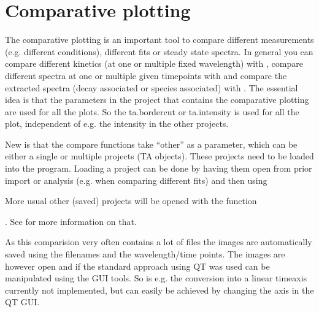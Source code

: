 \documentclass[letterpaper,10pt,english]{sphinxmanual}
\begin{document}
\chapter{Comparative plotting}
\label{\detokenize{Comparing:comparative-plotting}}\label{\detokenize{Comparing::doc}}
The comparative plotting is an important tool to compare different
measurements (e.g. different conditions), different fits or steady state
spectra. In general you can compare different kinetics
(at one or multiple fixed wavelength) with {\hyperref[\detokenize{Comparing:compare-at-wave}]{}} ,
compare different spectra at one or multiple given timepoints with
{\hyperref[\detokenize{Comparing:compare-at-time}]{}} and compare the extracted spectra (decay associated
or species associated) with {\hyperref[\detokenize{Comparing:compare-dac}]{}}. The essential idea is that the
parameters in the project that contains the comparative plotting are used
for all the plots. So the ta.bordercut or ta.intensity is used for all
the plot, independent of e.g. the intensity in the other projects.

New is that the compare functions take “other” as a parameter, which can
be either a single or multiple projects (TA \sphinxhyphen{} objects). These projects
need to be loaded into the program. Loading a project can be done by
having them open from prior import or analysis (e.g. when comparing different fits)
and then using

{\hyperref[\detokenize{plot_func:plot_func.TA.Copy}]{}}

More usual other (saved) projects will be
opened with the function

{\hyperref[\detokenize{plot_func:plot_func.GUI_open}]{}}

. See {\hyperref[\detokenize{Opening:opening-multiple-files}]{}}
for more information on that.

As this comparision very often contains a lot of files the images are
automatically saved using the filenames and the wavelength/time points.
The images are however open and if the standard approach using QT was
used can be manipulated using the GUI tools. So is e.g. the conversion
into a linear time\sphinxhyphen{}axis currently not implemented, but can easily be
achieved by changing the axis in the QT GUI.
\end{document}
